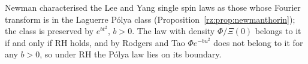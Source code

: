 \begin{remark}
Newman \cite{Newman74} characterised the Lee and Yang single spin laws as those whose Fourier transform is in the Laguerre P\'olya class (Proposition~\ref{rz:prop:newmanthorin}); the class is preserved by $e^{bt^2}$, $b>0$. The law with density $\Phi/\Xi(0)$ belongs to it if and only if RH holds, and by Rodgers and Tao $\Phi e^{-bu^2}$ does not belong to it for any $b>0$, so under RH the P\'olya law lies on its boundary.
\end{remark}
